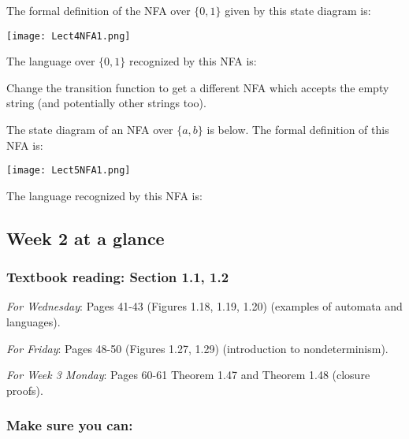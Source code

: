 \documentclass[12pt, oneside]{article}
\begin{document}
The formal definition of the NFA over $\{0,1\}$ given by this state diagram is: 

\texttt{[image: Lect4NFA1.png]}

The language over $\{0,1\}$ recognized by this NFA is:

\vspace{70pt}

Change the transition function to get a different NFA which accepts
the empty string (and potentially other strings too).


\newpage

The state diagram of an NFA over $\{a,b\}$ is below.  The formal definition of this NFA is:

\vspace{-30pt}

\texttt{[image: Lect5NFA1.png]}


\vspace{-10pt}

The language recognized by this NFA is:  


\newpage
\subsection*{Week 2 at a glance}

\subsubsection*{Textbook reading: Section 1.1, 1.2}

{\it For Wednesday}: Pages 41-43 (Figures 1.18, 1.19, 1.20) (examples of automata and languages).

{\it For Friday}: Pages 48-50 (Figures 1.27, 1.29) (introduction to nondeterminism).

{\it For Week 3 Monday}: Pages 60-61 Theorem 1.47 and Theorem 1.48 (closure proofs).


\subsubsection*{Make sure you can:}
\end{document}
